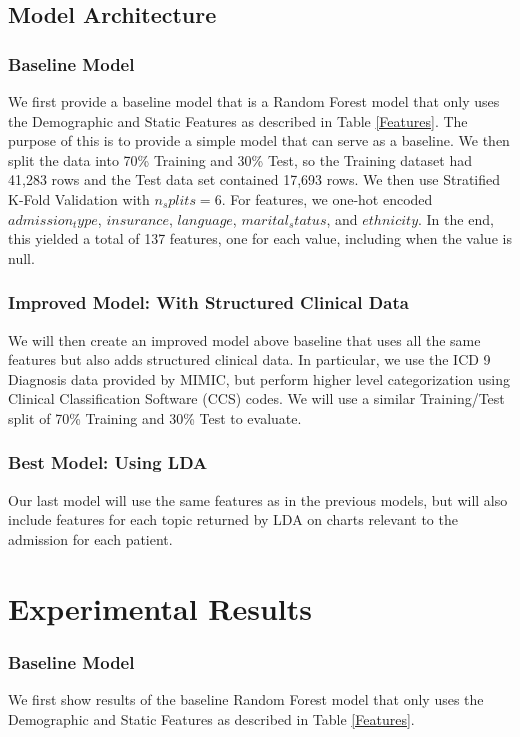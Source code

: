 \documentclass[12pt, final]{article}
\begin{document}
\subsection{Model Architecture}
\label{Model Architecture}

\subsubsection{Baseline Model}
We first provide a baseline model that is a Random Forest model that only uses the Demographic and Static Features as described in Table \ref{Features}. The purpose of this is to provide a simple model that can serve as a baseline. We then split the data into 70\% Training and 30\% Test, so the Training dataset had 41,283 rows and the Test data set contained 17,693 rows. We then use Stratified K-Fold Validation with $n_splits = 6$. For features, we one-hot encoded $admission_type$, $insurance$, $language$, $marital_status$, and $ethnicity$. In the end, this yielded a total of 137 features, one for each value, including when the value is null.

\subsubsection{Improved Model: With Structured Clinical Data}
We will then create an improved model above baseline that uses all the same features but also adds structured clinical data. In particular, we use the ICD 9 Diagnosis data provided by MIMIC, but perform higher level categorization using Clinical Classification Software (CCS) codes. We will use a similar Training/Test split of 70\% Training and 30\% Test to evaluate.

\subsubsection{Best Model: Using LDA}
Our last model will use the same features as in the previous models, but will also include features for each topic returned by LDA on charts relevant to the admission for each patient.

\section{Experimental Results}
\label{Experimental Results}

\subsubsection{Baseline Model}
We first show results of the baseline Random Forest model that only uses the Demographic and Static Features as described in Table \ref{Features}.
\end{document}
